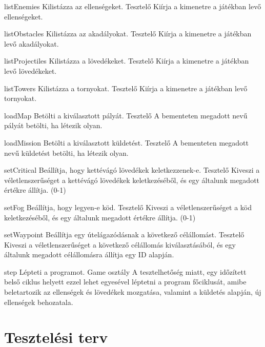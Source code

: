 \usecase
{listEnemies}
{Kilistázza az ellenségeket.}
{Tesztelő}
{Kiírja a kimenetre a játékban levő ellenségeket.}

\usecase
{listObstacles}
{Kilistázza az akadályokat.}
{Tesztelő}
{Kiírja a kimenetre a játékban levő akadályokat.}

\usecase
{listProjectiles}
{Kilistázza a lövedékeket.}
{Tesztelő}
{Kiírja a kimenetre a játékban levő lövedékeket.}

\usecase
{listTowers}
{Kilistázza a tornyokat.}
{Tesztelő}
{Kiírja a kimenetre a játékban levő tornyokat.}

\usecase
{loadMap}
{Betölti a kiválasztott pályát.}
{Tesztelő}
{A bementeten megadott nevű pályát betölti, ha létezik olyan.}

\usecase
{loadMission}
{Betölti a kiválasztott küldetést.}
{Tesztelő}
{A bementeten megadott nevű küldetést betölti, ha létezik olyan.}

\usecase
{setCritical}
{Beállítja, hogy kettévágó lövedékek keletkezzenek-e.}
{Tesztelő}
{Kiveszi a véletlenszerűséget a kettévágó lövedékek keletkezéséből, és egy általunk megadott értékre állítja. (0-1)}

\usecase
{setFog}
{Beállítja, hogy legyen-e köd.}
{Tesztelő}
{Kiveszi a véletlenszerűséget a köd keletkezéséből, és egy általunk megadott értékre állítja. (0-1)}

\usecase
{setWaypoint}
{Beállítja egy útelágazódásnak a következő célállomást.}
{Tesztelő}
{Kiveszi a véletlenszerűséget a következő célállomás kiválasztásából, és egy általunk megadott célállomásra állítja egy ID alapján.}

\usecase
{step}
{Lépteti a programot.}
{Game osztály}
{A tesztelhetőség miatt, egy időzített belső ciklus helyett ezzel lehet egyesével léptetni a program főciklusát,
 amibe beletartozik az ellenségek és lövedékek mozgatása, valamint a küldetés alapján, új ellenségek behozatala.}

\section{Tesztelési terv}

